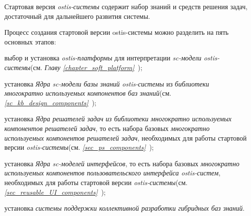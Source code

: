 Стартовая версия \textit{ostis-системы} содержит набор знаний и средств решения задач, достаточный для дальнейшего развития системы.

Процесс создания стартовой версии ostis-системы можно разделить на пять основных этапов:
\begin{textitemize}
\item выбор и установка \textit{ostis-платформы} для интерпретации \textit{sc-модели ostis-системы}(см. \textit{Главу \ref{chapter_soft_platform}~});

\item установка \textit{Ядра sc-модели базы знаний ostis-системы} из \textit{библиотеки многократно используемых компонентов баз знаний}(см. \textit{\ref{sc_kb_design_components}~});

\item установка \textit{Ядра решателей задач из библиотеки многократно используемых компонентов решателей задач}, то есть набора базовых \textit{многократно используемых компонентов решателей задач}, необходимых для работы стартовой версии \textit{ostis-системы}(см. \textit{\ref{sec_ps_components}~});

\item установка \textit{Ядра sc-моделей интерфейсов}, то есть набора базовых \textit{многократно используемых компонентов пользовательского интерфейса ostis-систем}, необходимых для работы стартовой версии \textit{ostis-системы}(см. \textit{\ref{sec_reusable_UI_components}~});

\item установка \textit{системы поддержки коллективной разработки гибридных баз знаний}.
\end{textitemize}

